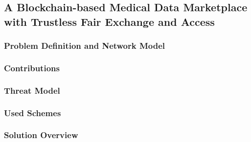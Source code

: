 \subsection{A Blockchain-based Medical Data Marketplace with Trustless Fair Exchange and Access~\cite{alsharif2020blockchain}}
\label{sec:blockchain-based-medical-data-marketplace-20}

\subsubsection{Problem Definition and Network Model}

\subsubsection{Contributions}

\subsubsection{Threat Model}

\subsubsection{Used Schemes}

\subsubsection{Solution Overview}
